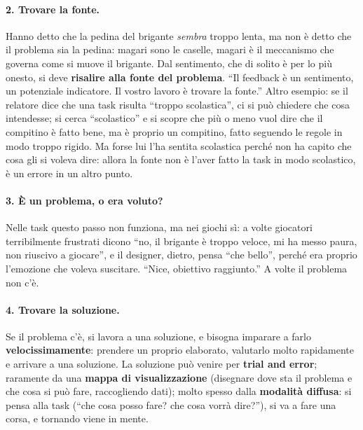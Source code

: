 \paragraph{2. Trovare la fonte.} Hanno detto che la pedina del brigante
\emph{sembra} troppo lenta, ma non è detto che il problema sia la pedina:
magari sono le caselle, magari è il meccanismo che governa come si muove il
brigante. Dal sentimento, che di solito è per lo più onesto, si deve
\textbf{risalire alla fonte del problema}. ``Il feedback è un sentimento, un
potenziale indicatore. Il vostro lavoro è trovare la fonte.'' Altro
esempio: se il relatore dice che una task risulta ``troppo scolastica'', ci
si può chiedere che cosa intendesse; si cerca ``scolastico'' e si scopre che
più o meno vuol dire che il compitino è fatto bene, ma è proprio un
compitino, fatto seguendo le regole in modo troppo rigido. Ma forse lui l'ha
sentita scolastica perché non ha capito che cosa gli si voleva dire: allora
la fonte non è l'aver fatto la task in modo scolastico, è un errore in un
altro punto.

\paragraph{3. È un problema, o era voluto?} Nelle task questo passo non
funziona, ma nei giochi sì: a volte giocatori terribilmente frustrati dicono
``no, il brigante è troppo veloce, mi ha messo paura, non riuscivo a
giocare'', e il designer, dietro, pensa ``che bello'', perché era proprio
l'emozione che voleva suscitare. ``Nice, obiettivo raggiunto.'' A volte il
problema non c'è.

\paragraph{4. Trovare la soluzione.} Se il problema c'è, si lavora a una
soluzione, e bisogna imparare a farlo \textbf{velocissimamente}: prendere un
proprio elaborato, valutarlo molto rapidamente e arrivare a una soluzione.
La soluzione può venire per \textbf{trial and error}; raramente da una
\textbf{mappa di visualizzazione} (disegnare dove sta il problema e che cosa
si può fare, raccogliendo dati); molto spesso dalla \textbf{modalità
diffusa}: si pensa alla task (``che cosa posso fare? che cosa vorrà
dire?''), si va a fare una corsa, e tornando viene in mente.

